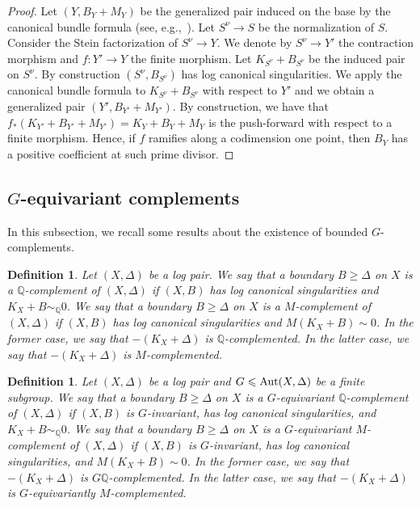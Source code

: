 \documentclass{amsart}
\renewcommand{\qq}{\mathbb{Q}}
\newtheorem{definition}[theorem]{Definition}
\theoremstyle{remark}
\numberwithin{equation}{section}
\begin{document}
\begin{proof}
Let $(Y,B_Y+M_Y)$ be the generalized pair induced on the base by the canonical bundle formula (see, e.g.,~\cite{Amb06}).
Let $S^\nu\rightarrow S$ be the normalization of $S$.
Consider the Stein factorization of $S^\nu \rightarrow Y$.
We denote by $S^\nu \rightarrow Y'$ the contraction morphism
and $f\colon Y'\rightarrow Y$ the finite morphism.
Let $K_{S^\nu}+B_{S^\nu}$ be the induced pair on $S^\nu$.
By construction $(S^\nu,B_{S^\nu})$ has log canonical singularities.
We apply the canonical bundle formula to $K_{S^\nu}+B_{S^\nu}$ with respect to $Y'$
and we obtain a generalized pair $(Y',B_{Y'}+M_{Y'})$.
By construction, we have that
$f_*(K_{Y'}+B_{Y'}+M_{Y'})= K_{Y}+B_{Y}+M_{Y}$ is the push-forward with respect to a finite morphism.
Hence, if $f$ ramifies along a codimension one point, then $B_Y$ has a positive coefficient at such prime divisor.
\end{proof}

\subsection{$G$-equivariant complements}\label{subsec:g-equiv-comp}
In this subsection, we recall some results about the existence of bounded $G$-complements.

\begin{definition}{\em 
Let $(X,\Delta)$ be a log pair.
We say that a boundary $B\geq \Delta$ on $X$ is a {\em $\qq$-complement}
of $(X,\Delta)$
if $(X,B)$ has log canonical singularities and $K_X+B\sim_\qq 0$.
We say that a boundary $B\geq \Delta$ on $X$ is a {\em $M$-complement}
of $(X,\Delta)$
if $(X,B)$ has log canonical singularities and $M(K_X+B)\sim 0$.
In the former case, we say that $-(K_X+\Delta)$ is {\em $\qq$-complemented}.
In the latter case, we say that $-(K_X+\Delta)$ is
{\em $M$-complemented}.
}
\end{definition}

\begin{definition}{\em 
Let $(X,\Delta)$ be a log pair
and $G\leqslant {\rm Aut}(X,\Delta)$ be a finite subgroup.
We say that a boundary $B\geq \Delta$ on $X$ is a {\em $G$-equivariant $\qq$-complement} of $(X,\Delta)$ 
if $(X,B)$ is $G$-invariant, has log canonical singularities, and
$K_X+B\sim_\qq 0$.
We say that a boundary $B\geq\Delta$ on $X$ is a {\em $G$-equivariant $M$-complement}
of $(X,\Delta)$
if $(X,B)$ is $G$-invariant, has log canonical singularities, and
$M(K_X+B)\sim 0$.
In the former case, we say that $-(K_X+\Delta)$ is {\em $G\qq$-complemented}.
In the latter case, we say that $-(K_X+\Delta)$ is 
{\em $G$-equivariantly $M$-complemented}.
}
\end{definition}
\end{document}
